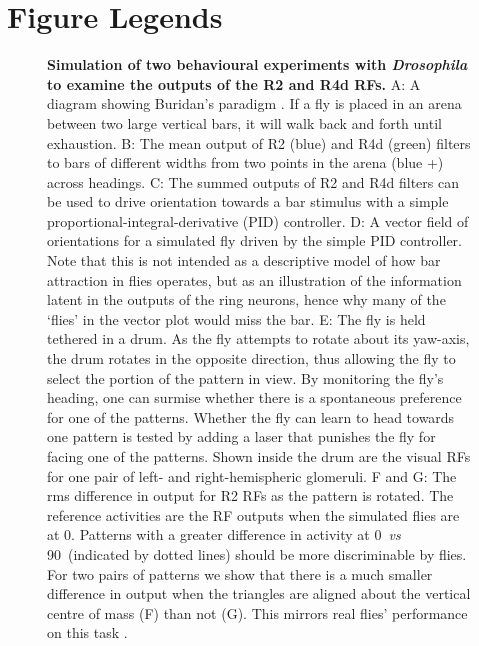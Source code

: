 \documentclass[10pt]{article}
\begin{document}
\section*{Figure Legends}
%
\begin{figure}[htp]
	\caption{
		{\bf Simulation of two behavioural experiments with \emph{Drosophila} to examine the outputs of the R2 and R4d RFs.}
		A: A diagram showing Buridan's paradigm \protect\cite{Gotz1980,Bulthoff1982}. If a fly is placed in an arena between two large vertical bars, it will walk back and forth until exhaustion.
		B: The mean output of R2 (blue) and R4d (green) filters to bars of different widths from two points in the arena (blue +) across headings.
		C: The summed outputs of R2 and R4d filters can be used to drive orientation towards a bar stimulus with a simple
		proportional-integral-derivative (PID) controller.
		D: A vector field of orientations for a simulated fly driven by the simple PID controller.
		Note that this is not intended as a descriptive model of how bar attraction in flies operates, but as an illustration of the information latent in the outputs of the ring neurons, hence why many of the `flies' in the vector plot would miss the bar.
		E: The fly is held tethered in a drum. As the fly attempts to rotate about its yaw-axis, the drum rotates in the opposite direction, thus allowing the fly to select the portion of the pattern in view.
		By monitoring the fly's heading, one can surmise whether there is a spontaneous preference for one of the patterns.
		Whether the fly can learn to head towards one pattern is tested by adding a laser that punishes the fly for facing one of the patterns.
		Shown inside the drum are the visual \acp{RF} for one pair of left- and right-hemispheric glomeruli.
		F and G: The \ac{rms} difference in output for R2 RFs as the pattern is rotated.
		The reference activities are the \ac{RF} outputs when the simulated flies are at 0\degree.
		Patterns with a greater difference in activity at 0\degree\ \emph{vs} 90\degree\ (indicated by dotted lines) should be more discriminable by flies.
		For two pairs of patterns we show that there is a much smaller difference in output when the triangles are aligned about the vertical centre of mass (F) than not (G).
		This mirrors real flies' performance on this task \cite{Ernst1999}.
	}
	\label{fig:recap}
\end{figure}
\end{document}
